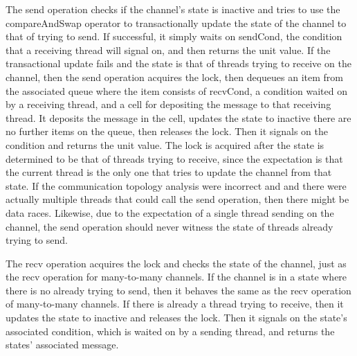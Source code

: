 \documentclass{article}
\begin{document}
The send operation checks if the channel's state is inactive and tries to use the
compareAndSwap operator to transactionally update the state of the channel to that of trying to
send.  If successful, it simply waits on sendCond, the condition that a receiving thread will
signal on, and then returns the unit value.  If the transactional update fails and the state is
that of threads trying to receive on the channel, then the send operation acquires the lock,
then dequeues an item from the associated queue where the item consists of recvCond, a
condition waited on by a receiving thread, and a cell for depositing the message to that
receiving thread.  It deposits the message in the cell, updates the state to inactive there are
no further items on the queue, then releases the lock.  Then it signals on the condition and
returns the unit value. The lock is acquired after the state is determined to be that of
threads trying to receive, since the expectation is that the current thread is the only one
that tries to update the channel from that state.  If the communication topology analysis were
incorrect and and there were actually multiple threads that could call the send operation, then
there might be data races.  Likewise, due to the expectation of a single thread sending on the
channel, the send operation should never witness the state of threads already trying to send.

The recv operation acquires the lock and checks the state of the channel, just as the recv
operation for many-to-many channels.  If the channel is in a state where there is no already
trying to send, then it behaves the same as the recv operation of many-to-many channels. If
there is already a thread trying to receive, then it updates the state to inactive and releases
the lock.  Then it signals on the state's associated condition, which is waited on by a sending
thread, and returns the states' associated message.
\end{document}
